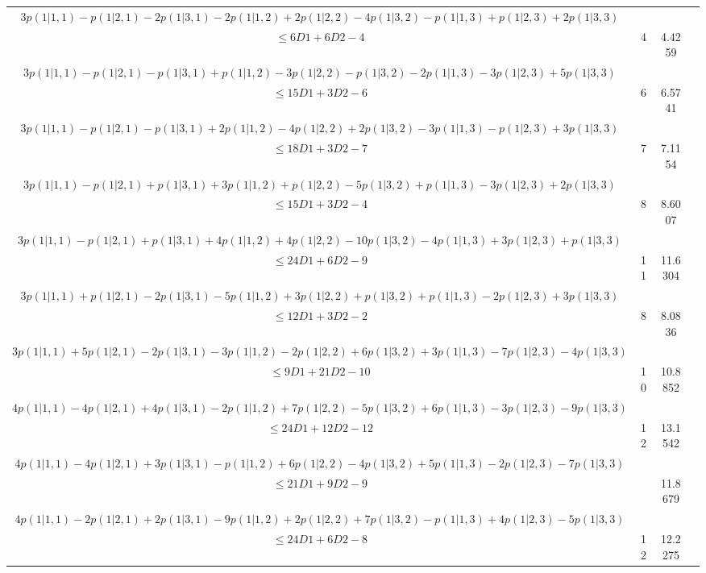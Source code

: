 \documentclass[11pt]{article}
\begin{document}
\begin{table}[htbp]
{\begin{tabular}{|c|c|c|c|}
    $3p(1|1,1) -p(1|2,1) -2p(1|3,1) -2p(1|1,2) +2p(1|2,2) -4p(1|3,2) -p(1|1,3) +p(1|2,3) +2p(1|3,3)$&&\\$ \leqslant 6D1 +6D2 -4$ & 4 & 4.4259\\ \hline

    $3p(1|1,1) -p(1|2,1) -p(1|3,1) +p(1|1,2) -3p(1|2,2) -p(1|3,2) -2p(1|1,3) -3p(1|2,3) +5p(1|3,3)$&&\\$ \leqslant 15D1 +3D2 -6$&6 & 6.5741 \\ \hline

    $3p(1|1,1) -p(1|2,1) -p(1|3,1) +2p(1|1,2) -4p(1|2,2) +2p(1|3,2) -3p(1|1,3) -p(1|2,3) +3p(1|3,3)$&&\\$ \leqslant 18D1 +3D2 -7$ & 7 &  7.1154\\ \hline

    $3p(1|1,1) -p(1|2,1) +p(1|3,1) +3p(1|1,2) +p(1|2,2) -5p(1|3,2) +p(1|1,3) -3p(1|2,3) +2p(1|3,3)$&&\\$ \leqslant 15D1 +3D2 -4$&8 &  8.6007 \\ \hline

    $3p(1|1,1) -p(1|2,1) +p(1|3,1) +4p(1|1,2) +4p(1|2,2) -10p(1|3,2) -4p(1|1,3) +3p(1|2,3) +p(1|3,3)$&&\\$ \leqslant 24D1 +6D2 -9$ & 11 & 11.6304 \\ \hline
    
    $3p(1|1,1) +p(1|2,1) -2p(1|3,1) -5p(1|1,2) +3p(1|2,2) +p(1|3,2) +p(1|1,3) -2p(1|2,3) +3p(1|3,3)$&&\\$ \leqslant 12D1 + 3D2 -2$ & 8  & 8.0836 \\ \hline
    
    $3p(1|1,1) +5p(1|2,1) -2p(1|3,1) -3p(1|1,2) -2p(1|2,2) +6p(1|3,2) +3p(1|1,3) -7p(1|2,3) -4p(1|3,3)$&&\\$ \leqslant 9D1 +21D2 -10$ &10 &  10.8852 \\ \hline

    $4p(1|1,1) -4p(1|2,1) +4p(1|3,1) -2p(1|1,2) +7p(1|2,2) -5p(1|3,2) +6p(1|1,3) -3p(1|2,3) -9p(1|3,3)$&&\\$ \leqslant 24D1 +12D2 -12$&12 &  13.1542  \\ \hline

    $4p(1|1,1) -4p(1|2,1) +3p(1|3,1) -p(1|1,2) +6p(1|2,2) -4p(1|3,2) +5p(1|1,3) -2p(1|2,3) -7p(1|3,3)$&&\\$ \leqslant 21D1 +9D2 -9$ & & 11.8679 \\ \hline

    $4p(1|1,1) -2p(1|2,1) +2p(1|3,1) -9p(1|1,2) +2p(1|2,2) +7p(1|3,2) -p(1|1,3) +4p(1|2,3) -5p(1|3,3)$&&\\$ \leqslant 24D1 +6D2  -8$&12 &12.2275 \\ \hline
    

\end{tabular}}
\end{table}
\end{document}
